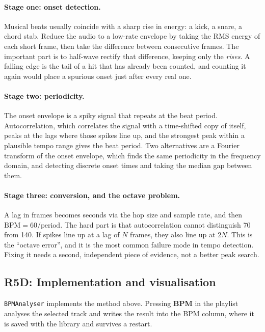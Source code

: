 \documentclass[11pt,a4paper]{article}
\newcommand{\code}[1]{\texttt{#1}}
\begin{document}
\paragraph{Stage one: onset detection.} Musical beats usually coincide with a
sharp rise in energy: a kick, a snare, a chord stab. Reduce the audio to a
low-rate envelope by taking the RMS energy of each short frame, then take the
difference between consecutive frames. The important part is to half-wave rectify
that difference, keeping only the \emph{rises}. A falling edge is the tail of a
hit that has already been counted, and counting it again would place a spurious
onset just after every real one.

\paragraph{Stage two: periodicity.} The onset envelope is a spiky signal that
repeats at the beat period. Autocorrelation, which correlates the signal with a
time-shifted copy of itself, peaks at the lags where those spikes line up, and
the strongest peak within a plausible tempo range gives the beat period. Two
alternatives are a Fourier transform of the onset envelope, which finds the same
periodicity in the frequency domain, and detecting discrete onset times and
taking the median gap between them.

\paragraph{Stage three: conversion, and the octave problem.} A lag in frames
becomes seconds via the hop size and sample rate, and then $\text{BPM} = 60 /
\text{period}$. The hard part is that autocorrelation cannot distinguish 70 from
140. If spikes line up at a lag of $N$ frames, they also line up at $2N$. This is
the ``octave error'', and it is the most common failure mode in tempo detection.
Fixing it needs a second, independent piece of evidence, not a better peak
search.

\subsection{R5D: Implementation and visualisation}
\label{sec:r5d}

\code{BPMAnalyser} implements the method above. Pressing \textbf{BPM} in the
playlist analyses the selected track and writes the result into the BPM column,
where it is saved with the library and survives a restart.
\end{document}
